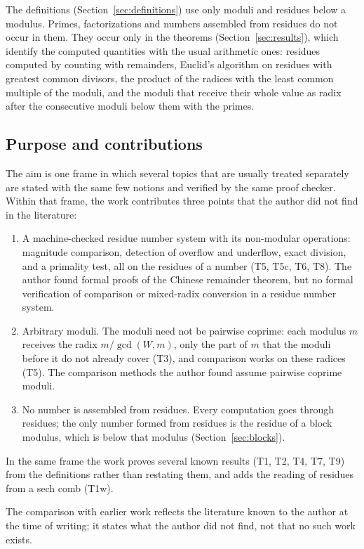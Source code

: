 \documentclass[11pt]{amsart}
\theoremstyle{definition}
\begin{document}
The definitions (Section~\ref{sec:definitions}) use only moduli and residues below a modulus.
Primes, factorizations and numbers assembled from residues do not occur in them. They occur
only in the theorems (Section~\ref{sec:results}), which identify the computed quantities with
the usual arithmetic ones: residues computed by counting with remainders, Euclid's algorithm on
residues with greatest common divisors, the product of the radices with the least common
multiple of the moduli, and the moduli that receive their whole value as radix after the
consecutive moduli below them with the primes.

\subsection*{Purpose and contributions}
The aim is one frame in which several topics that are usually treated separately are stated
with the same few notions and verified by the same proof checker. Within that frame, the work
contributes three points that the author did not find in the literature:
\begin{enumerate}
  \item[(C1)] A machine-checked residue number system with its non-modular operations:
    magnitude comparison, detection of overflow and underflow, exact division, and a primality
    test, all on the residues of a number (T5, T5c, T6, T8). The author found formal proofs of
    the Chinese remainder theorem, but no formal verification of comparison or mixed-radix
    conversion in a residue number system.
  \item[(C2)] Arbitrary moduli. The moduli need not be pairwise coprime: each modulus $m$
    receives the radix $m / \gcd(W, m)$, only the part of $m$ that the moduli before it do not
    already cover (T3), and comparison works on these radices (T5). The comparison methods the
    author found assume pairwise coprime moduli.
  \item[(C3)] No number is assembled from residues. Every computation goes through residues;
    the only number formed from residues is the residue of a block modulus, which is below that
    modulus (Section~\ref{sec:blocks}).
\end{enumerate}
In the same frame the work proves several known results (T1, T2, T4, T7, T9) from the
definitions rather than restating them, and adds the reading of residues from a sech comb (T1w).

The comparison with earlier work reflects the literature known to the author at the time of
writing; it states what the author did not find, not that no such work exists.
\end{document}
